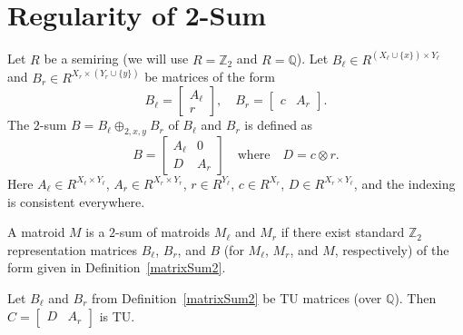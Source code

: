 \chapter{Regularity of 2-Sum}

\begin{definition}
    \label{matrixSum2}
    \leanok
    Let $R$ be a semiring (we will use $R = \mathbb{Z}_{2}$ and $R = \mathbb{Q}$). Let $B_{\ell} \in R^{(X_{\ell} \cup \{x\}) \times Y_{\ell}}$ and $B_{r} \in R^{X_{r} \times (Y_{r} \cup \{y\})}$ be matrices of the form
    \[
        B_{\ell} = \begin{bmatrix} A_{\ell} \\ r \end{bmatrix}, \quad
        B_{r} = \begin{bmatrix} c & A_{r} \end{bmatrix}.
    \]
    The $2$-sum $B = B_{\ell} \oplus_{2, x, y} B_{r}$ of $B_{\ell}$ and $B_{r}$ is defined as
    \[
        B = \begin{bmatrix} A_{\ell} & 0 \\ D & A_{r} \end{bmatrix}
        \quad \text{where} \quad
        D = c \otimes r.
    \]
    Here $A_{\ell} \in R^{X_{\ell} \times Y_{\ell}}$, $A_{r} \in R^{X_{r} \times Y_{r}}$, $r \in R^{Y_{\ell}}$, $c \in R^{X_{r}}$, $D \in R^{X_{r} \times Y_{\ell}}$, and the indexing is consistent everywhere.
\end{definition} %

\begin{definition}
    \label{Matroid.Is2sumOf}
    \leanok
    A matroid $M$ is a $2$-sum of matroids $M_{\ell}$ and $M_{r}$ if there exist standard $\mathbb{Z}_{2}$ representation matrices $B_{\ell}$, $B_{r}$, and $B$ (for $M_{\ell}$, $M_{r}$, and $M$, respectively) of the form given in Definition~\ref{matrixSum2}.
\end{definition}

\begin{lemma}
    \label{Matrix.IsTotallyUnimodular.fromCols_outer}
    \leanok
    Let $B_{\ell}$ and $B_{r}$ from Definition~\ref{matrixSum2} be TU matrices (over $\mathbb{Q}$). Then $C = \begin{bmatrix} D & A_{r} \end{bmatrix}$ is TU.
\end{lemma}

